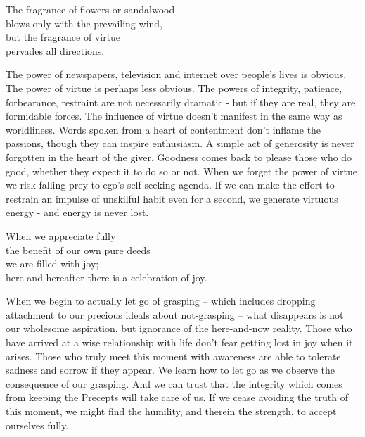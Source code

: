 
\begin{dhpVerse}{54}
\label{dhp-54}
The fragrance of flowers or sandalwood\\
blows only with the prevailing wind,\\
but the fragrance of virtue\\
pervades all directions.
\end{dhpVerse}

\begin{dhpRefl}
The power of newspapers, television and internet over people's lives is obvious. The power of virtue is perhaps less obvious. The powers of integrity, patience, forbearance, restraint are not necessarily dramatic - but if they are real, they are formidable forces. The influence of virtue doesn't manifest in the same way as worldliness. Words spoken from a heart of contentment don't inflame the passions, though they can inspire enthusiasm. A simple act of generosity is never forgotten in the heart of the giver. Goodness comes back to please those who do good, whether they expect it to do so or not. When we forget the power of virtue, we risk falling prey to ego's self-seeking agenda. If we can make the effort to restrain an impulse of unskilful habit even for a second, we generate virtuous energy - and energy is never lost.
\end{dhpRefl}


\begin{dhpVerse}{16}
\label{dhp-16}
When we appreciate fully\\
the benefit of our own pure deeds\\
we are filled with joy;\\
here and hereafter there is a celebration of joy.
\end{dhpVerse}

\begin{dhpRefl}
When we begin to actually let go of grasping – which includes dropping attachment to our precious ideals about not-grasping – what disappears is not our wholesome aspiration, but ignorance of the here-and-now reality. Those who have arrived at a wise relationship with life don't fear getting lost in joy when it arises. Those who truly meet this moment with awareness are able to tolerate sadness and sorrow if they appear. We learn how to let go as we observe the consequence of our grasping. And we can trust that the integrity which comes from keeping the Precepts will take care of us. If we cease avoiding the truth of this moment, we might find the humility, and therein the strength, to accept ourselves fully.
\end{dhpRefl}

